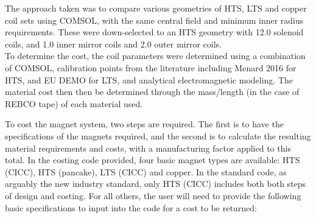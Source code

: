 The approach taken was to compare various geometries of HTS, LTS and copper coil sets using COMSOL, with the same central field and minimum inner radius requirements. These were down-selected to an HTS geometry with 12.0 solenoid coils, and 1.0 inner mirror coils and 2.0 outer mirror coils.\\

To determine the cost, the coil parameters were determined using a combination of COMSOL, calibration points from the literature including Menard 2016 \cite{Menard2016} for HTS, and EU DEMO for LTS, and analytical electromagnetic modeling. The material cost then then be determined through the mass/length (in the case of REBCO tape) of each material used. 

To cost the magnet system, two steps are required. The first is to have the specifications of the magnets required, and the second is to calculate the resulting material requirements and costs, with a manufacturing factor applied to this total. In the costing code provided, four basic magnet types are available: HTS (CICC), HTS (pancake), LTS (CICC) and copper. In the standard code, as arguably the new industry standard, only HTS (CICC) includes both both steps of design and costing. For all others, the user will need to provide the following basic specifications to input into the code for a cost to be returned:

